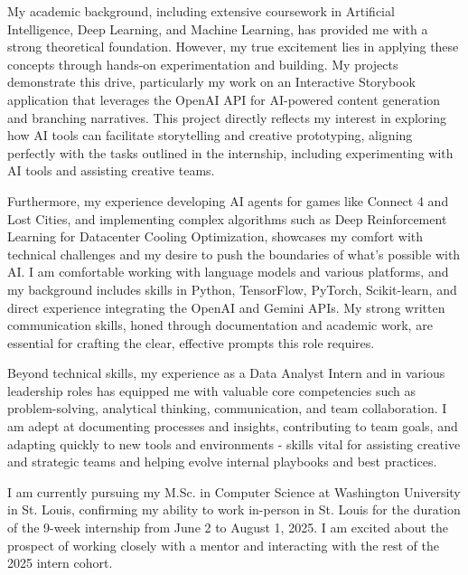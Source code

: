 \documentclass[10pt, letterpaper]{article}
\begin{document}
\vspace{\headerSpacing}
\begin{onecolentry}
    My academic background, including extensive coursework in Artificial Intelligence, Deep Learning, and Machine Learning, has provided me with a strong theoretical foundation. However, my true excitement lies in applying these concepts through hands-on experimentation and building. My projects demonstrate this drive, particularly my work on an Interactive Storybook application that leverages the OpenAI API for AI-powered content generation and branching narratives. This project directly reflects my interest in exploring how AI tools can facilitate storytelling and creative prototyping, aligning perfectly with the tasks outlined in the internship, including experimenting with AI tools and assisting creative teams.
\end{onecolentry}

\vspace{\headerSpacing}
\begin{onecolentry}
    Furthermore, my experience developing AI agents for games like Connect 4 and Lost Cities, and implementing complex algorithms such as Deep Reinforcement Learning for Datacenter Cooling Optimization, showcases my comfort with technical challenges and my desire to push the boundaries of what’s possible with AI. I am comfortable working with language models and various platforms, and my background includes skills in Python, TensorFlow, PyTorch, Scikit-learn, and direct experience integrating the OpenAI and Gemini APIs. My strong written communication skills, honed through documentation and academic work, are essential for crafting the clear, effective prompts this role requires.
\end{onecolentry}

\vspace{\headerSpacing}
\begin{onecolentry}
    Beyond technical skills, my experience as a Data Analyst Intern and in various leadership roles has equipped me with valuable core competencies such as problem-solving, analytical thinking, communication, and team collaboration. I am adept at documenting processes and insights, contributing to team goals, and adapting quickly to new tools and environments - skills vital for assisting creative and strategic teams and helping evolve internal playbooks and best practices.
\end{onecolentry}

\vspace{\headerSpacing}
\begin{onecolentry}
    I am currently pursuing my M.Sc. in Computer Science at Washington University in St. Louis, confirming my ability to work in-person in St. Louis for the duration of the 9-week internship from June 2 to August 1, 2025. I am excited about the prospect of working closely with a mentor and interacting with the rest of the 2025 intern cohort.
\end{onecolentry}
\end{document}
